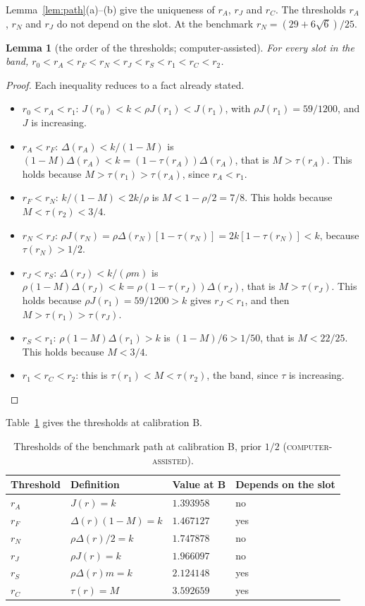 \documentclass[11pt]{article}
\newtheorem{lemma}{Lemma}
\theoremstyle{definition}
\newcommand{\lab}[1]{\textsc{#1}}
\begin{document}
Lemma~\ref{lem:path}(a)--(b) give the uniqueness of $r_A$, $r_J$ and $r_C$. The thresholds $r_A$, $r_N$ and $r_J$
do not depend on the slot. At the benchmark $r_N=(29+6\sqrt6)/25$.

\begin{lemma}[the order of the thresholds; computer-assisted]\label{lem:order}
For every slot in the band, $r_0<r_A<r_F<r_N<r_J<r_S<r_1<r_C<r_2$.
\end{lemma}

\begin{proof}
Each inequality reduces to a fact already stated.
\begin{itemize}
\item $r_0<r_A<r_1$: $J(r_0)<k<\rho J(r_1)<J(r_1)$, with $\rho J(r_1)=59/1200$, and $J$ is increasing.
\item $r_A<r_F$: $\Delta(r_A)<k/(1-M)$ is $(1-M)\Delta(r_A)<k=(1-\tau(r_A))\Delta(r_A)$, that is $M>\tau(r_A)$.
  This holds because $M>\tau(r_1)>\tau(r_A)$, since $r_A<r_1$.
\item $r_F<r_N$: $k/(1-M)<2k/\rho$ is $M<1-\rho/2=7/8$. This holds because $M<\tau(r_2)<3/4$.
\item $r_N<r_J$: $\rho J(r_N)=\rho\Delta(r_N)[1-\tau(r_N)]=2k[1-\tau(r_N)]<k$, because $\tau(r_N)>1/2$.
\item $r_J<r_S$: $\Delta(r_J)<k/(\rho m)$ is $\rho(1-M)\Delta(r_J)<k=\rho(1-\tau(r_J))\Delta(r_J)$, that is
  $M>\tau(r_J)$. This holds because $\rho J(r_1)=59/1200>k$ gives $r_J<r_1$, and then $M>\tau(r_1)>\tau(r_J)$.
\item $r_S<r_1$: $\rho(1-M)\Delta(r_1)>k$ is $(1-M)/6>1/50$, that is $M<22/25$. This holds because $M<3/4$.
\item $r_1<r_C<r_2$: this is $\tau(r_1)<M<\tau(r_2)$, the band, since $\tau$ is increasing.\qedhere
\end{itemize}
\end{proof}

Table~\ref{tab:thresholds} gives the thresholds at calibration B.

\begin{table}[h]
\centering
\caption{Thresholds of the benchmark path at calibration B, prior $1/2$ (\lab{computer-assisted}).}\label{tab:thresholds}
\small
\begin{tabular}{@{}llll@{}}
\toprule
Threshold & Definition & Value at B & Depends on the slot\\
\midrule
$r_A$ & $J(r)=k$ & $1.393958$ & no\\
$r_F$ & $\Delta(r)(1-M)=k$ & $1.467127$ & yes\\
$r_N$ & $\rho\Delta(r)/2=k$ & $1.747878$ & no\\
$r_J$ & $\rho J(r)=k$ & $1.966097$ & no\\
$r_S$ & $\rho\Delta(r)m=k$ & $2.124148$ & yes\\
$r_C$ & $\tau(r)=M$ & $3.592659$ & yes\\
\bottomrule
\end{tabular}
\end{table}
\end{document}
